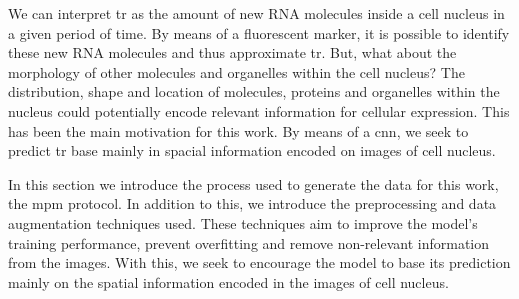 
\glsresetall

We can interpret \gls{tr} as the amount of new RNA molecules inside a cell nucleus in a given period of time. By means of a fluorescent marker, it is possible to identify these new RNA molecules and thus approximate \gls{tr}. But, what about the morphology of other molecules and organelles within the cell nucleus? The distribution, shape and location of molecules, proteins and organelles within the nucleus could potentially encode relevant information for cellular expression. This has been the main motivation for this work. By means of a \gls{cnn}, we seek to predict \gls{tr} base mainly in spacial information encoded on images of cell nucleus.

In this section we introduce the process used to generate the data for this work, the \gls{mpm} protocol. In addition to this, we introduce the preprocessing and data augmentation techniques used. These techniques aim to improve the model's training performance, prevent overfitting and remove non-relevant information from the images. With this, we seek to encourage the model to base its prediction mainly on the spatial information encoded in the images of cell nucleus.
